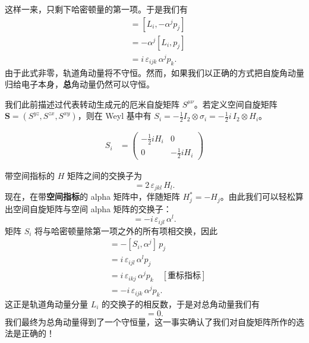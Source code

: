 这样一来，只剩下哈密顿量的第一项。于是我们有
\begin{align*}
[L_{i},H] &= [L_{i},-\alpha^{j}p_{j}]\\
&= -\alpha^{j}[L_{i},p_{j}]\\
&= i\,\varepsilon_{ijk}\,\alpha^{j}p_{k}.
\end{align*}
由于此式非零，轨道角动量将不守恒。然而，如果我们以正确的方式把自旋角动量归给电子本身，\textbf{总}角动量仍然可以守恒。

我们此前描述过代表转动生成元的厄米自旋矩阵 $S^{\mu\nu}$。若定义空间自旋矩阵 $\mathbf{S}=(S^{yz},S^{zx},S^{xy})$，则在 Weyl 基中有 $S_{i}=-\tfrac12 I_{2}\otimes\sigma_{i}=-\tfrac12 i\,I_{2}\otimes H_{i}$。

\begin{keybox}
\begin{align}
S_{i} &= \begin{pmatrix}-\tfrac12 iH_{i}&0\\ 0&-\tfrac12 iH_{i}\end{pmatrix} \tag{Riemannian}
\end{align}
\end{keybox}

带空间指标的 $H$ 矩阵之间的交换子为
\begin{equation}
[H_{j},H_{k}]=2\,\varepsilon_{jkl}\,H_{l}.
\end{equation}
现在，在带\textbf{空间指标}的 alpha 矩阵中，伴随矩阵 $H_{j}^{*}=-H_{j}$。由此我们可以轻松算出空间自旋矩阵与空间 alpha 矩阵的交换子：
\begin{equation}
[S_{i},\alpha^{j}]=-i\,\varepsilon_{ijl}\,\alpha^{l}.
\end{equation}
矩阵 $S_{i}$ 将与哈密顿量除第一项之外的所有项相交换，因此
\begin{align*}
[S_{i},H] &= -[S_{i},\alpha^{j}]\,p_{j}\\
&= i\,\varepsilon_{ijl}\,\alpha^{l}p_{j}\\
&= i\,\varepsilon_{ikj}\,\alpha^{j}p_{k}\quad[\text{重标指标}]\\
&= -i\,\varepsilon_{ijk}\,\alpha^{j}p_{k}.
\end{align*}
这正是轨道角动量分量 $L_{i}$ 的交换子的相反数，于是对总角动量我们有
\begin{equation}
[L+S,H]=0.
\end{equation}
我们最终为总角动量得到了一个守恒量，这一事实确认了我们对自旋矩阵所作的选法是正确的！
